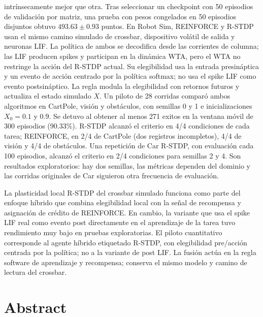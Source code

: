intrínsecamente mejor que otra. Tras seleccionar un checkpoint con 50
episodios de validación por matriz, una prueba con pesos congelados en 50 episodios
disjuntos obtuvo $493.63\pm0.93$ puntos. En Robot Sim, REINFORCE y R-STDP
usan el mismo camino simulado de crossbar, dispositivo vol\'atil de salida y
neuronas LIF. La pol\'itica de ambos se decodifica desde las corrientes de
columna; las LIF producen spikes y participan en la din\'amica WTA, pero el WTA
no restringe la acci\'on del R-STDP actual. Su elegibilidad usa la entrada
presin\'aptica y un evento de acci\'on centrado por la pol\'itica softmax; no
usa el spike LIF como evento postsin\'aptico. La regla modula la elegibilidad
con retornos futuros y actualiza el estado simulado $X$. Un piloto de 28
corridas compar\'o ambos algoritmos en CartPole, visi\'on y obst\'aculos, con
semillas 0 y 1 e inicializaciones $X_0=0.1$ y $0.9$. Se detuvo al obtener al
menos 271 exitos en la ventana m\'ovil de 300 episodios (90.33\%). R-STDP
alcanz\'o el criterio en 4/4 condiciones de cada tarea; REINFORCE, en 2/4 de
CartPole (dos registros incompletos), 4/4 de visi\'on y 4/4 de obst\'aculos.
Una repetici\'on de Car R-STDP, con evaluaci\'on cada 100 episodios, alcanz\'o
el criterio en 2/4 condiciones para semillas 2 y 4. Son resultados
exploratorios: hay dos semillas, las m\'etricas dependen del dominio y las
corridas originales de Car siguieron otra frecuencia de evaluaci\'on.

La plasticidad local R-STDP del crossbar simulado funciona como parte del
enfoque h\'ibrido que combina elegibilidad local con la se\~nal de recompensa
y asignaci\'on de cr\'edito de REINFORCE. En cambio, la variante que usa el
spike LIF real como evento post directamente en el aprendizaje de la tarea
tuvo rendimiento muy bajo en pruebas exploratorias. El piloto cuantitativo
corresponde al agente h\'ibrido etiquetado R-STDP, con elegibilidad
pre/acci\'on centrada por la pol\'itica; no a la variante de post LIF.
La fusi\'on act\'ua en la regla software de aprendizaje y recompensa; conserva
el mismo modelo y camino de lectura del crossbar.

\chapter*{Abstract}


